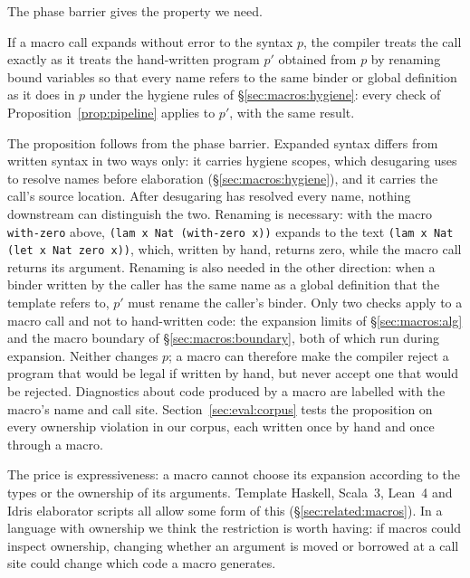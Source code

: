 The phase barrier gives the property we need.

\begin{proposition}\label{prop:transparency}
If a macro call expands without error to the syntax $p$, the compiler treats the call exactly as it treats the hand-written program $p'$ obtained from $p$ by renaming bound variables so that every name refers to the same binder or global definition as it does in $p$ under the hygiene rules of \S\ref{sec:macros:hygiene}: every check of Proposition~\ref{prop:pipeline} applies to $p'$, with the same result.
\end{proposition}

The proposition follows from the phase barrier.
Expanded syntax differs from written syntax in two ways only: it carries hygiene scopes, which desugaring uses to resolve names before elaboration (\S\ref{sec:macros:hygiene}), and it carries the call's source location.
After desugaring has resolved every name, nothing downstream can distinguish the two.
Renaming is necessary: with the macro \lstinline|with-zero| above, \lstinline|(lam x Nat (with-zero x))| expands to the text \lstinline|(lam x Nat (let x Nat zero x))|, which, written by hand, returns zero, while the macro call returns its argument.
Renaming is also needed in the other direction: when a binder written by the caller has the same name as a global definition that the template refers to, $p'$ must rename the caller's binder.
Only two checks apply to a macro call and not to hand-written code: the expansion limits of \S\ref{sec:macros:alg} and the macro boundary of \S\ref{sec:macros:boundary}, both of which run during expansion.
Neither changes $p$; a macro can therefore make the compiler reject a program that would be legal if written by hand, but never accept one that would be rejected.
Diagnostics about code produced by a macro are labelled with the macro's name and call site.
Section~\ref{sec:eval:corpus} tests the proposition on every ownership violation in our corpus, each written once by hand and once through a macro.

The price is expressiveness: a macro cannot choose its expansion according to the types or the ownership of its arguments.
Template Haskell, Scala~3, Lean~4 and Idris elaborator scripts all allow some form of this (\S\ref{sec:related:macros}).
In a language with ownership we think the restriction is worth having: if macros could inspect ownership, changing whether an argument is moved or borrowed at a call site could change which code a macro generates.

